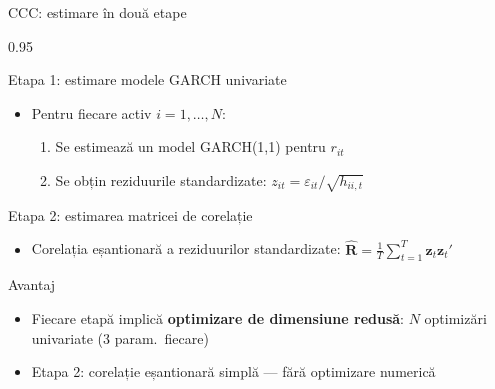 \documentclass[9pt, aspectratio=169, t]{beamer}
\begin{document}
\begin{frame}{CCC: estimare în două etape}
    \begin{cminipage}{0.95\textwidth}
    \vspace{-2mm}
    {\scriptsize
    \begin{block}{Etapa 1: estimare modele GARCH univariate}
        \begin{itemize}\setlength{\itemsep}{0pt}
            \item Pentru fiecare activ $i = 1, \ldots, N$:
                \begin{enumerate}\setlength{\itemsep}{0pt}
                    \item Se estimează un model GARCH(1,1) pentru $r_{it}$
                    \item Se obțin reziduurile standardizate: $z_{it} = \varepsilon_{it} / \sqrt{h_{ii,t}}$
                \end{enumerate}
        \end{itemize}
    \end{block}
    \vspace{-1mm}
    \begin{block}{Etapa 2: estimarea matricei de corelație}
        \begin{itemize}\setlength{\itemsep}{0pt}
            \item Corelația eșantionară a reziduurilor standardizate:
            $\hat{\mathbf{R}} = \frac{1}{T}\sum_{t=1}^T \mathbf{z}_t\mathbf{z}_t'$
        \end{itemize}
    \end{block}
    \vspace{-1mm}
    \begin{alertblock}{Avantaj}
        \begin{itemize}\setlength{\itemsep}{0pt}
            \item Fiecare etapă implică \textbf{optimizare de dimensiune redusă}: $N$ optimizări univariate (3 param.\ fiecare)
            \item Etapa 2: corelație eșantionară simplă --- fără optimizare numerică
        \end{itemize}
    \end{alertblock}
    }
    \end{cminipage}
\end{frame}
\end{document}
